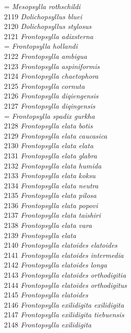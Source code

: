 \documentclass[
]{article}
\begin{document}
= \emph{Mesopsylla rothschildi}\\
2119 \emph{Dolichopsyllus bluei}\\
2120 \emph{Dolichopsyllus stylosus}\\
2121 \emph{Frontopsylla adixsterna}\\
= \emph{Frontopsylla hollandi}\\
2122 \emph{Frontopsylla ambigua}\\
2123 \emph{Frontopsylla aspiniformis}\\
2124 \emph{Frontopsylla chaetophora}\\
2125 \emph{Frontopsylla cornuta}\\
2126 \emph{Frontopsylla diqiengensis}\\
2127 \emph{Frontopsylla diqingensis}\\
= \emph{Frontopsylla spadix gurkha}\\
2128 \emph{Frontopsylla elata botis}\\
2129 \emph{Frontopsylla elata caucasica}\\
2130 \emph{Frontopsylla elata elata}\\
2131 \emph{Frontopsylla elata glabra}\\
2132 \emph{Frontopsylla elata humida}\\
2133 \emph{Frontopsylla elata koksu}\\
2134 \emph{Frontopsylla elata neutra}\\
2135 \emph{Frontopsylla elata pilosa}\\
2136 \emph{Frontopsylla elata popovi}\\
2137 \emph{Frontopsylla elata taishiri}\\
2138 \emph{Frontopsylla elata vara}\\
2139 \emph{Frontopsylla elata}\\
2140 \emph{Frontopsylla elatoides elatoides}\\
2141 \emph{Frontopsylla elatoides intermedia}\\
2142 \emph{Frontopsylla elatoides longa}\\
2143 \emph{Frontopsylla elatoides orthodigitia}\\
2144 \emph{Frontopsylla elatoides orthodigitus}\\
2145 \emph{Frontopsylla elatoides}\\
2146 \emph{Frontopsylla exilidigita exilidigita}\\
2147 \emph{Frontopsylla exilidigita tiebuensis}\\
2148 \emph{Frontopsylla exilidigita}\\
\end{document}
